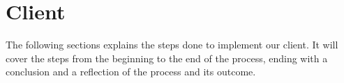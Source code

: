 \section{Client}
The following sections explains the steps done to implement our client. It will cover the steps from the beginning to the end of the process, ending with a conclusion and a reflection of the process and its outcome.




